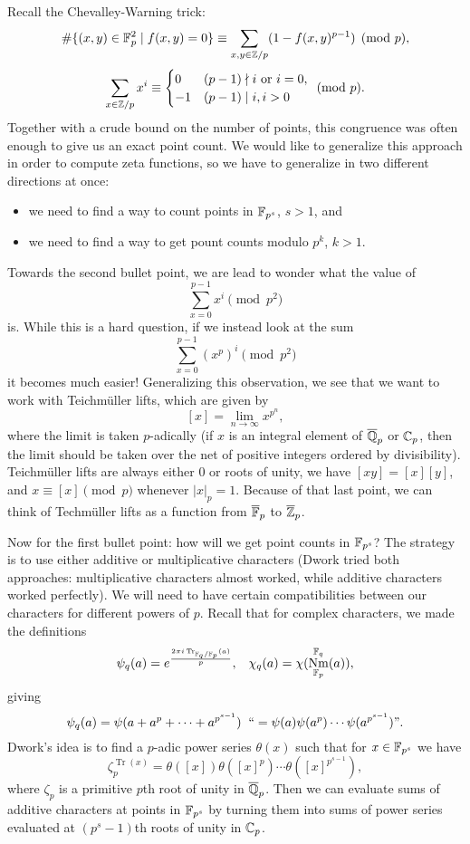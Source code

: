 \documentclass[letterpaper,11pt]{article}
\DeclareMathOperator{\Nm}{Nm}
\DeclareMathOperator{\Tr}{Tr}
\begin{document}
Recall the Chevalley-Warning trick:
\[
\#\{(x,y) \in \mathbb{F}_p^2 \mid f(x,y) = 0\} \equiv \sum_{x,y \in \mathbb{Z}/p} (1 - f(x,y)^{p-1}) \pmod{p},
\]
\[
\sum_{x\in\mathbb{Z}/p} x^i \equiv \begin{cases}0 & (p-1)\nmid i \text{ or } i = 0,\\ -1 & (p-1)\mid i, i > 0\end{cases} \pmod{p}.
\]
Together with a crude bound on the number of points, this congruence was often enough to give us an exact point count. We would like to generalize this approach in order to compute zeta functions, so we have to generalize in two different directions at once:
\begin{itemize}
\item we need to find a way to count points in $\mathbb{F}_{p^s}$, $s > 1$, and
\item we need to find a way to get pount counts modulo $p^k$, $k > 1$.
\end{itemize}
Towards the second bullet point, we are lead to wonder what the value of
\[
\sum_{x=0}^{p-1} x^i \pmod{p^2}
\]
is. While this is a hard question, if we instead look at the sum
\[
\sum_{x=0}^{p-1} (x^p)^i \pmod{p^2}
\]
it becomes much easier! Generalizing this observation, we see that we want to work with Teichm\"uller lifts, which are given by
\[
[x] = \lim_{n\rightarrow \infty} x^{p^n},
\]
where the limit is taken $p$-adically (if $x$ is an integral element of $\overline{\mathbb{Q}}_p$ or $\mathbb{C}_p$, then the limit should be taken over the net of positive integers ordered by divisibility). Teichm\"uller lifts are always either $0$ or roots of unity, we have $[xy] = [x][y]$, and $x \equiv [x] \pmod{p}$ whenever $|x|_p = 1$. Because of that last point, we can think of Techm\"uller lifts as a function from $\overline{\mathbb{F}}_p$ to $\overline{\mathbb{Z}}_p$.

Now for the first bullet point: how will we get point counts in $\mathbb{F}_{p^s}$? The strategy is to use either additive or multiplicative characters (Dwork tried both approaches: multiplicative characters almost worked, while additive characters worked perfectly). We will need to have certain compatibilities between our characters for different powers of $p$. Recall that for complex characters, we made the definitions
\[
\psi_q(a) = e^{\frac{2\pi i\Tr_{\FF_q/\FF_p}(a)}{p}},\;\;\; \chi_q(a) = \chi(\Nm^{\FF_q}_{\FF_p}(a)),
\]
giving
\[
\psi_q(a) = \psi(a+a^p + \cdots + a^{p^{s-1}})\;\; ``=\psi(a)\psi(a^p)\cdots \psi(a^{p^{s-1}})".
\]
Dwork's idea is to find a $p$-adic power series $\theta(x)$ such that for $x \in \mathbb{F}_{p^s}$ we have
\[
\zeta_p^{\Tr(x)} = \theta([x])\theta([x]^p)\cdots \theta([x]^{p^{s-1}}),
\]
where $\zeta_p$ is a primitive $p$th root of unity in $\overline{\mathbb{Q}}_p$. Then we can evaluate sums of additive characters at points in $\mathbb{F}_{p^s}$ by turning them into sums of power series evaluated at $(p^s-1)$th roots of unity in $\mathbb{C}_p$.
\end{document}
